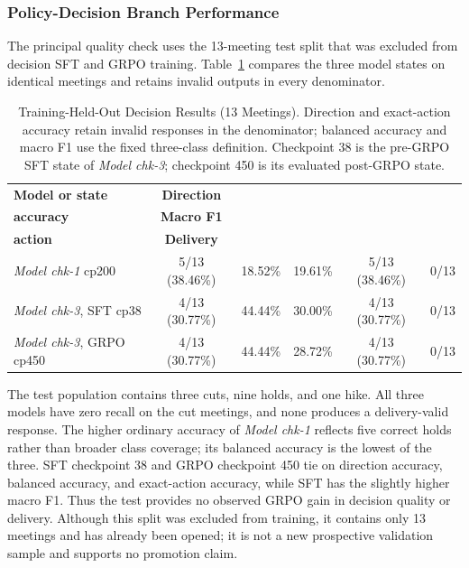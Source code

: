 
\subsubsection*{Policy-Decision Branch Performance}

The principal quality check uses the 13-meeting test split that was excluded
from decision SFT and GRPO training. Table~\ref{tab:ch2:decision_test_n13}
compares the three model states on identical meetings and retains invalid
outputs in every denominator.

\begin{table}[htbp]
    \centering
    \footnotesize
    \setlength{\tabcolsep}{4pt}
    \begin{tabularx}{\textwidth}{@{}>{\raggedright\arraybackslash}Xccccc@{}}
        \toprule
        \textbf{Model or state} & \textbf{Direction} &
        \makecell{\textbf{Balanced}\\\textbf{accuracy}} &
        \textbf{Macro F1} & \makecell{\textbf{Exact}\\\textbf{action}} &
        \textbf{Delivery} \\
        \midrule
        \textit{Model chk-1} cp200 & 5/13 (38.46\%) & 18.52\% & 19.61\% & 5/13 (38.46\%) & 0/13 \\
        \textit{Model chk-3}, SFT cp38 & 4/13 (30.77\%) & 44.44\% & 30.00\% & 4/13 (30.77\%) & 0/13 \\
        \textit{Model chk-3}, GRPO cp450 & 4/13 (30.77\%) & 44.44\% & 28.72\% & 4/13 (30.77\%) & 0/13 \\
        \bottomrule
    \end{tabularx}
    \caption{Training-Held-Out Decision Results (13 Meetings). Direction and exact-action accuracy retain invalid responses in the denominator; balanced accuracy and macro F1 use the fixed three-class definition. Checkpoint 38 is the pre-GRPO SFT state of \textit{Model chk-3}; checkpoint 450 is its evaluated post-GRPO state.}
    \label{tab:ch2:decision_test_n13}
\end{table}

The test population contains three cuts, nine holds, and one hike. All three
models have zero recall on the cut meetings, and none produces a delivery-valid
response. The higher ordinary accuracy of \textit{Model chk-1} reflects five
correct holds rather than broader class coverage; its balanced accuracy is the
lowest of the three. SFT checkpoint 38 and GRPO checkpoint 450 tie on direction
accuracy, balanced accuracy, and exact-action accuracy, while SFT has the
slightly higher macro F1. Thus the test provides no observed GRPO gain in
decision quality or delivery. Although this split was excluded from training,
it contains only 13 meetings and has already been opened; it is not a new
prospective validation sample and supports no promotion claim.

